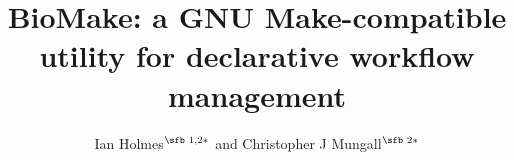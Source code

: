 \documentclass{bioinfo}
\begin{document}

\newcommand\structabs[5]{
\abstract{
{\bf Motivation.}
#1
{\bf Results.}
#2
{\bf Availability and Implementation.}
#3
{\bf Contact.}
#4
{\bf Supplementary Information.}
#5
}
\maketitle
}

\title[BioMake: declarative workflow management]{BioMake: a GNU Make-compatible utility for declarative workflow management}
\author[Ian Holmes and Christopher J Mungall]{Ian Holmes$^{\text{\sfb 1,2}*}$ and Christopher J Mungall$^{\text{\sfb 2}*}$}
\address{$^{\text{\sf 1}}$Department of Bioengineering, University of California, Berkeley, CA 94720, USA and \\
$^{\text{\sf 2}}$Environmental Genomics and Systems Biology Division, Lawrence Berkeley National Laboratory, 1 Cyclotron Rd, Berkeley, CA 94720, USA.}


\history{}

\editor{}


\end{document}
